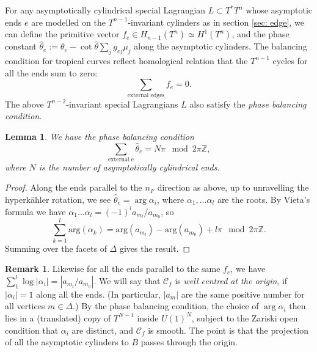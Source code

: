 \documentclass{article}
\newtheorem{lem}[thm]{Lemma}
\theoremstyle{definition}
\newtheorem{rmk}{Remark}
\newcommand{\Z}{\mathbb{Z}}
\begin{document}
	
	
	
	For any asymptotically cylindrical special Lagrangian
	$L\subset T^*T^n$ whose asymptotic ends $e$ are modelled on the $T^{n-1}$-invariant cylinders as in section \ref{sec: edge}, we can define the primitive vector $f_e\in H_{n-1}(T^n)\simeq H^1(T^n)$, and the phase constant $\hat{\theta}_e:= \theta_e- \cot \hat{\theta} \sum_j g_{ej}\mu_j$ along the asymptotic cylinders.
	The balancing condition for tropical curves reflect homological relation that the $T^{n-1}$ cycles for all the ends sum to zero:
	\[
	\sum_{\text{external edges}}  f_e=0.
	\]
	The above $T^{n-2}$-invariant special Lagrangians $L$ also satisfy the \emph{phase balancing condition}. 
	
	\begin{lem}
		We have the phase balancing condition
		\[
		\sum_{\text{external e}} \hat{\theta}_e= N\pi \mod 2\pi \Z,
		\]
		where $N$ is the number of asymptotically cylindrical ends.
		
	\end{lem}
	
	
	
	\begin{proof}
		Along the ends parallel to the $n_F$ direction as above, up to unravelling the hyperk\"ahler rotation, we see $\hat{\theta}_e= \arg \alpha_i$, where $\alpha_1,\ldots \alpha_l$ are the roots. 
		By Vieta's formula we have 
		$\alpha_1\ldots \alpha_l= (-1)^l a_{m_l}/ a_{m_0}$, so
		\[
		\sum_{k=1}^l \mbox{arg}(\alpha_k)=\mbox{arg}(a_{m_l})-\mbox{arg}(a_{m_0} )+ l\pi  \mod 2\pi \Z.
		\]
		Summing over the facets of $\Delta$ gives the result.
	\end{proof}
	
	
	
	
	\begin{rmk}\label{rmk:wellcentred}
		Likewise for all the ends parallel to the same $f_e$, we have $\sum_1^l \log |\alpha_i |= |a_{m_l}/ a_{m_0}| $. We will say that $\mathcal{C}_f$ is \emph{well centred at the origin}, if $ |\alpha_i|=1  $ along all the ends. (In particular, $|a_m|$ are the same positive number for all vertices $m\in \Delta$.) By the phase balancing condition, the choice of $\arg \alpha_i$ then lies in a (translated) copy of $T^{N-1}$ inside $U(1)^N$, subject to the Zariski open condition that $\alpha_i$ are distinct, and $\mathcal{C}_f$ is smooth. The point is that the projection of all the asymptotic cylinders to $B$ passes through the origin.
	\end{rmk}
	
\end{document}
